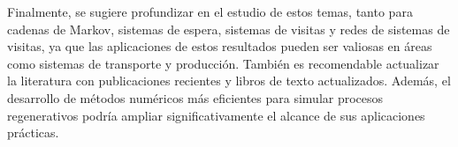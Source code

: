 \documentclass{article}
\numberwithin{equation}{section}
\begin{document}
Finalmente, se sugiere profundizar en el estudio de estos temas, tanto para cadenas de Markov, sistemas de espera, sistemas de visitas y redes de sistemas de visitas, ya que las aplicaciones de estos resultados pueden ser valiosas en áreas como sistemas de transporte y producción. También es recomendable actualizar la literatura con publicaciones recientes y libros de texto actualizados. Además, el desarrollo de métodos numéricos más eficientes para simular procesos regenerativos podría ampliar significativamente el alcance de sus aplicaciones prácticas.








\end{document}
